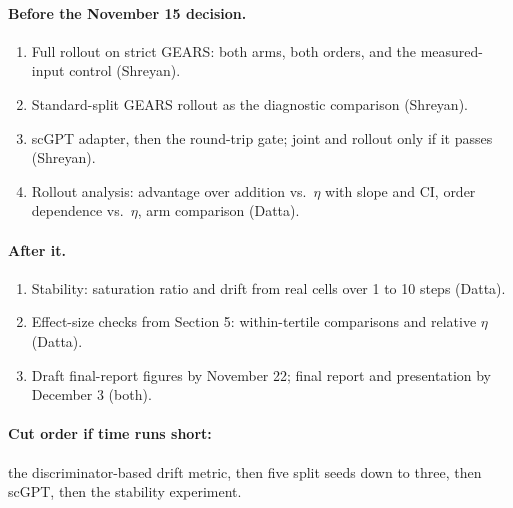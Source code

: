 \documentclass[11pt]{article}
\begin{document}
\paragraph{Before the November 15 decision.}
\begin{enumerate}
  \item Full rollout on strict GEARS: both arms, both orders, and the measured-input control (Shreyan).
  \item Standard-split GEARS rollout as the diagnostic comparison (Shreyan).
  \item scGPT adapter, then the round-trip gate; joint and rollout only if it passes (Shreyan).
  \item Rollout analysis: advantage over addition vs.\ $\eta$ with slope and CI, order dependence vs.\ $\eta$, arm comparison (Datta).
\end{enumerate}

\paragraph{After it.}
\begin{enumerate}
  \item Stability: saturation ratio and drift from real cells over 1 to 10 steps (Datta).
  \item Effect-size checks from Section 5: within-tertile comparisons and relative $\eta$ (Datta).
  \item Draft final-report figures by November 22; final report and presentation by December 3 (both).
\end{enumerate}

\paragraph{Cut order if time runs short:} the discriminator-based drift metric, then five
split seeds down to three, then scGPT, then the stability experiment.
\end{document}
